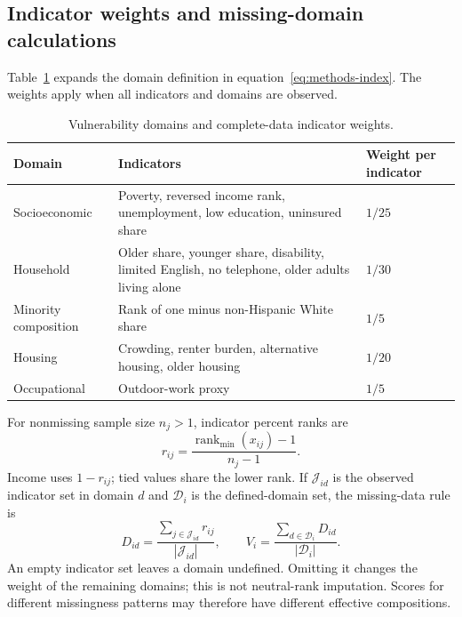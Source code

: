 \documentclass[11pt,letterpaper]{article}
\begin{document}
\subsection{Indicator weights and missing-domain calculations}
\label{supp:weights}
Table~\ref{tab:domains} expands the domain definition in equation~\eqref{eq:methods-index}. The weights apply when all indicators and domains are observed.
\begin{longtable}{@{}p{}p{}p{}@{}}
\caption{Vulnerability domains and complete-data indicator weights.}\label{tab:domains}\\
\toprule
Domain & Indicators & Weight per indicator\\
\midrule
\endhead
Socioeconomic & Poverty, reversed income rank, unemployment, low education, uninsured share & \(1/25\)\\
Household & Older share, younger share, disability, limited English, no telephone, older adults living alone & \(1/30\)\\
Minority composition & Rank of one minus non-Hispanic White share & \(1/5\)\\
Housing & Crowding, renter burden, alternative housing, older housing & \(1/20\)\\
Occupational & Outdoor-work proxy & \(1/5\)\\
\bottomrule
\end{longtable}
For nonmissing sample size \(n_j>1\), indicator percent ranks are
\begin{equation}
 r_{ij}=\frac{\operatorname{rank}_{\min}(x_{ij})-1}{n_j-1}.
\end{equation}
Income uses \(1-r_{ij}\); tied values share the lower rank. If \(\mathcal J_{id}\) is the observed indicator set in domain \(d\) and \(\mathcal D_i\) is the defined-domain set, the missing-data rule is
\begin{equation}
 D_{id}=\frac{\sum_{j\in\mathcal J_{id}}r_{ij}}{|\mathcal J_{id}|},
 \qquad V_i=\frac{\sum_{d\in\mathcal D_i}D_{id}}{|\mathcal D_i|}.
\end{equation}
An empty indicator set leaves a domain undefined. Omitting it changes the weight of the remaining domains; this is not neutral-rank imputation. Scores for different missingness patterns may therefore have different effective compositions.
\end{document}
